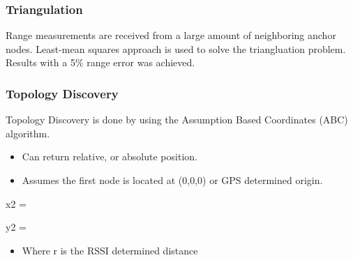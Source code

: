 \begin{frame}[t]
  \frametitle{Triangulation}

  \vfill
  Range measurements are received from a large amount of neighboring anchor
  nodes.
  \vfill
  Least-mean squares approach is used to solve the triangluation problem.
  \vfill
  Results with a 5\% range error was achieved.

  \vfill
    \begin{flushleft}
    \begin{tiny}
      \begin{minipage}{1.0\linewidth}
      \end{minipage}
    \end{tiny}
  \end{flushleft}

\end{frame}

\begin{frame}[t]
  \frametitle{Topology Discovery}

  Topology Discovery is done by using the Assumption Based Coordinates (ABC)
  algorithm.

  \begin{itemize}
  \item Can return relative, or absolute position.
  \item Assumes the first node is located at (0,0,0) or GPS determined origin.
  \end{itemize}
  
  \begin{center}
    x2 = 
  \end{center} \linebreak
  \begin{center}
    y2 = 
  \end{center}

  \vfill
  
  \begin{itemize}
  \item Where r is the RSSI determined distance
  \end{itemize}

  \vfill
    \begin{flushleft}
    \begin{tiny}
      \begin{minipage}{1.0\linewidth}
      \end{minipage}
    \end{tiny}
  \end{flushleft}

\end {frame}

